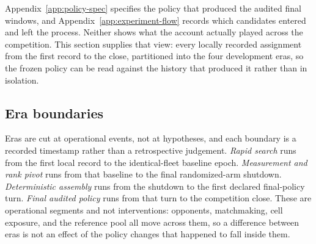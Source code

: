 Appendix~\ref{app:policy-spec} specifies the policy that produced the audited
final windows, and Appendix~\ref{app:experiment-flow} records which candidates
entered and left the process. Neither shows what the account actually played
across the competition. This section supplies that view: every locally recorded
assignment from the first record to the close, partitioned into the four
development eras, so the frozen policy can be read against the history that
produced it rather than in isolation.

\subsection{Era boundaries}

Eras are cut at operational events, not at hypotheses, and each boundary is a
recorded timestamp rather than a retrospective judgement. \emph{Rapid search}
runs from the first local record to the identical-fleet baseline epoch.
\emph{Measurement and rank pivot} runs from that baseline to the final
randomized-arm shutdown. \emph{Deterministic assembly} runs from the shutdown
to the first declared final-policy turn. \emph{Final audited policy} runs from
that turn to the competition close. These are operational segments and not
interventions: opponents, matchmaking, cell exposure, and the reference pool
all move across them, so a difference between eras is not an effect of the
policy changes that happened to fall inside them.

